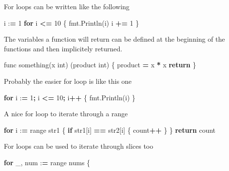 \documentclass[]{book}
\newenvironment{Shaded}{\begin{snugshade}}{\end{snugshade}}
\newcommand{\BuiltInTok}[1]{#1}
\newcommand{\ControlFlowTok}[1]{\textcolor[rgb]{0.13,0.29,0.53}{\textbf{#1}}}
\newcommand{\DecValTok}[1]{\textcolor[rgb]{0.00,0.00,0.81}{#1}}
\newcommand{\NormalTok}[1]{#1}
\newcommand{\OperatorTok}[1]{\textcolor[rgb]{0.81,0.36,0.00}{\textbf{#1}}}
\begin{document}
For loops can be written like the following

\begin{Shaded}
\begin{Highlighting}[]
\NormalTok{i :}\OperatorTok{=} \DecValTok{1}
\ControlFlowTok{for}\NormalTok{ i }\OperatorTok{<=} \DecValTok{10}\NormalTok{ \{}
\NormalTok{    fmt.Println(i)}
\NormalTok{    i }\OperatorTok{+=} \DecValTok{1}
\NormalTok{\}}
\end{Highlighting}
\end{Shaded}

The variables a function will return can be defined at the beginning of the functions and then implicitely returned.

\begin{Shaded}
\begin{Highlighting}[]
\NormalTok{func something(x }\BuiltInTok{int}\NormalTok{) (product }\BuiltInTok{int}\NormalTok{) \{}
\NormalTok{    product }\OperatorTok{=}\NormalTok{ x }\OperatorTok{*}\NormalTok{ x}
    \ControlFlowTok{return}
\NormalTok{\}}
\end{Highlighting}
\end{Shaded}

Probably the easier for loop is like this one

\begin{Shaded}
\begin{Highlighting}[]
\ControlFlowTok{for}\NormalTok{ i :}\OperatorTok{=} \DecValTok{1}\OperatorTok{;}\NormalTok{ i }\OperatorTok{<=} \DecValTok{10}\OperatorTok{;}\NormalTok{ i}\OperatorTok{++}\NormalTok{ \{}
\NormalTok{    fmt.Println(i)}
\NormalTok{\}}
\end{Highlighting}
\end{Shaded}

A nice for loop to iterate through a range

\begin{Shaded}
\begin{Highlighting}[]
\ControlFlowTok{for}\NormalTok{ i :}\OperatorTok{=} \BuiltInTok{range}\NormalTok{ str1 \{}
    \ControlFlowTok{if}\NormalTok{ str1[i] }\OperatorTok{==}\NormalTok{ str2[i] \{ count}\OperatorTok{++}\NormalTok{ \}}
\NormalTok{\}}
\ControlFlowTok{return}\NormalTok{ count}
\end{Highlighting}
\end{Shaded}

For loops can be used to iterate through slices too

\begin{Shaded}
\begin{Highlighting}[]
\ControlFlowTok{for}\NormalTok{ _, num :}\OperatorTok{=} \BuiltInTok{range}\NormalTok{ nums \{}
\end{Highlighting}
\end{Shaded}
\end{document}
